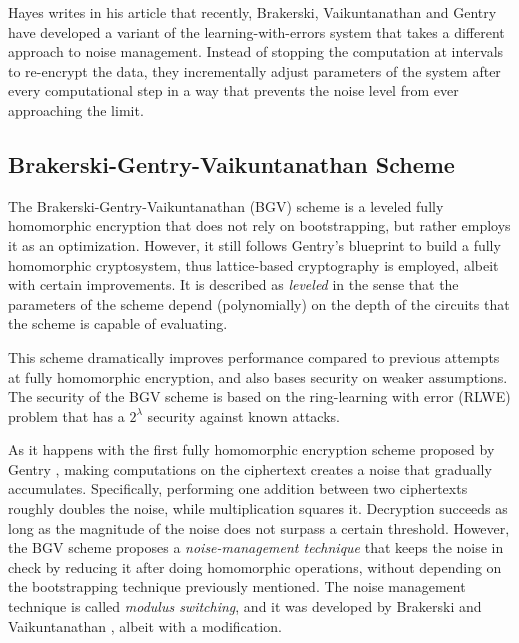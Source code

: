 Hayes \cite{Hayes2012} writes in his article that recently, Brakerski, Vaikuntanathan and Gentry have developed a variant of the learning-with-errors system that takes a different approach to noise management. Instead of stopping the computation at intervals to re-encrypt the data, they incrementally adjust parameters of the system after every computational step in a way that prevents the noise level from ever approaching the limit.

\subsection{Brakerski-Gentry-Vaikuntanathan Scheme}

The Brakerski-Gentry-Vaikuntanathan (BGV) scheme \cite{cryptoeprint:2011:277} is a leveled fully homomorphic encryption that does not rely on bootstrapping, but rather employs it as an optimization. However, it still follows Gentry's blueprint to build a fully homomorphic cryptosystem, thus lattice-based cryptography is employed, albeit with certain improvements. It is described as \emph{leveled} in the sense that the parameters of the scheme depend (polynomially) on the depth of the circuits that the scheme is capable of evaluating.

This scheme dramatically improves performance compared to previous attempts at fully homomorphic encryption, and also bases security on weaker assumptions. The security of the BGV scheme is based on the ring-learning with error (RLWE) problem that has a $2^{\lambda}$ security against known attacks.

As it happens with the first fully homomorphic encryption scheme proposed by Gentry \cite{homoenc}, making computations on the ciphertext creates a noise that gradually accumulates. Specifically, performing one addition between two ciphertexts roughly doubles the noise, while multiplication squares it. Decryption succeeds as long as the magnitude of the noise does not surpass a certain threshold. However, the BGV scheme proposes a \emph{noise-management technique} that keeps the noise in check by reducing  it after doing homomorphic operations, without depending on the bootstrapping technique previously mentioned. The noise management technique is called \emph{modulus switching}, and it was developed by Brakerski and Vaikuntanathan \cite{cryptoeprint:2011:344}, albeit with a modification. 

